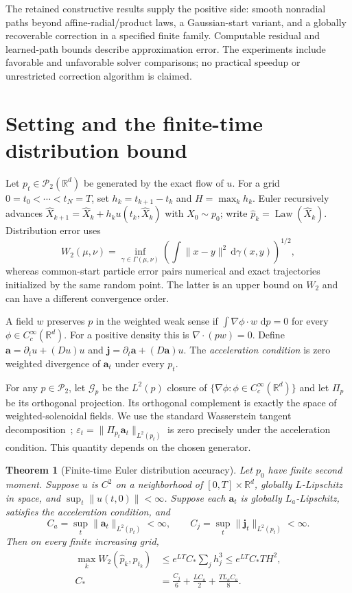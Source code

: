 \documentclass[journal,10pt,romanappendices]{IEEEtran}
\newtheorem{theorem}{Theorem}
\theoremstyle{definition}
\newcommand{\R}{\mathbb R}
\newcommand{\Law}{\operatorname{Law}}
\newcommand{\dd}{\,\mathrm d}
\newcommand{\acc}{\mathbf a}
\newcommand{\jerk}{\mathbf j}
\begin{document}
The retained constructive results supply the positive side: smooth nonradial paths beyond affine-radial/product laws, a Gaussian-start variant, and a globally recoverable correction in a specified finite family. Computable residual and learned-path bounds describe approximation error. The experiments include favorable and unfavorable solver comparisons; no practical speedup or unrestricted correction algorithm is claimed.

\section{Setting and the finite-time distribution bound}
\label{sec:revision-setup}

Let $p_t\in\mathcal P_2(\R^d)$ be generated by the exact flow of $u$. For a grid $0=t_0<\cdots<t_N=T$, set $h_k=t_{k+1}-t_k$ and $H=\max_k h_k$. Euler recursively advances
$\widehat X_{k+1}=\widehat X_k+h_ku(t_k,\widehat X_k)$ with $\widehat X_0\sim p_0$; write $\widehat p_k=\Law(\widehat X_k)$. Distribution error uses
\[
 W_2(\mu,\nu)=\inf_{\gamma\in\Gamma(\mu,\nu)}
       \left(\int\|x-y\|^2\dd\gamma(x,y)\right)^{1/2},
\]
whereas common-start particle error pairs numerical and exact trajectories initialized by the same random point. The latter is an upper bound on $W_2$ and can have a different convergence order.

A field $w$ preserves $p$ in the weighted weak sense if
$\int\nabla\phi\cdot w\,\dd p=0$ for every $\phi\in C_c^\infty(\R^d)$.
For a positive density this is $\nabla\cdot(pw)=0$. Define
$\acc=\partial_tu+(Du)u$ and $\jerk=\partial_t\acc+(D\acc)u$.
The \emph{acceleration condition} is zero weighted divergence of $\acc_t$ under every $p_t$.

For any $p\in\mathcal P_2$, let $\mathcal G_p$ be the $L^2(p)$ closure of
$\{\nabla\phi:\phi\in C_c^\infty(\R^d)\}$ and let $\Pi_p$ be its
orthogonal projection. Its orthogonal complement is exactly the space of
weighted-solenoidal fields. We use the standard Wasserstein tangent
decomposition~\citep{ambrosio2005gradient};
$\varepsilon_t=\|\Pi_{p_t}\acc_t\|_{L^2(p_t)}$ is zero precisely under
the acceleration condition. This quantity depends on the chosen generator.

\begin{theorem}[Finite-time Euler distribution accuracy]
\label{thm:distribution_order}
Let $p_0$ have finite second moment. Suppose $u$ is $C^2$ on a neighborhood of $[0,T]\times\R^d$, globally $L$-Lipschitz in space, and $\sup_t\|u(t,0)\|<\infty$. Suppose each $\acc_t$ is globally $L_a$-Lipschitz, satisfies the acceleration condition, and
\[
 C_a=\sup_t\|\acc_t\|_{L^2(p_t)}<\infty,\qquad
 C_j=\sup_t\|\jerk_t\|_{L^2(p_t)}<\infty.
\]
Then on every finite increasing grid,
\begin{align}
 \max_kW_2(\widehat p_k,p_{t_k})
 &\le e^{LT}C_*\sum_jh_j^3\le e^{LT}C_*TH^2,\nonumber\\
 C_*&=\frac{C_j}{6}+\frac{LC_a}{2}+\frac{TL_aC_a}{8}.
 \label{eq:general-bound}
\end{align}
\end{theorem}
\end{document}
